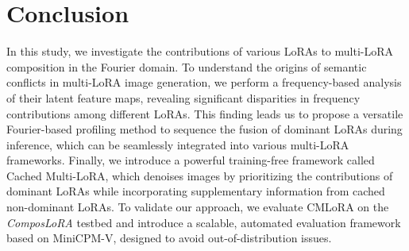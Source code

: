 \vspace{-11pt}
\section{Conclusion}
\vspace{-9pt}
In this study, we investigate the contributions of various LoRAs to multi-LoRA composition in the Fourier domain. To understand the origins of semantic conflicts in multi-LoRA image generation, we perform a frequency-based analysis of their latent feature maps, revealing significant disparities in frequency contributions among different LoRAs. This finding leads us to propose a versatile Fourier-based profiling method to sequence the fusion of dominant LoRAs during inference, which can be seamlessly integrated into various multi-LoRA frameworks. Finally, we introduce a powerful training-free framework called Cached Multi-LoRA, which denoises images by prioritizing the contributions of dominant LoRAs while incorporating supplementary information from cached non-dominant LoRAs. To validate our approach, we evaluate CMLoRA on the \textit{ComposLoRA} testbed and introduce a scalable, automated evaluation framework based on MiniCPM-V, designed to avoid out-of-distribution issues. 
